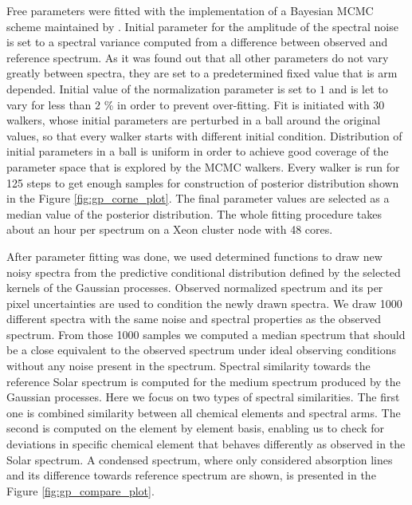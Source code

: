 Free parameters were fitted with the implementation of a Bayesian MCMC scheme maintained by \cite{2013PASP..125..306F}. Initial parameter for the amplitude of the spectral noise is set to a spectral variance computed from a difference between observed and reference spectrum. As it was found out that all other parameters do not vary greatly between spectra, they are set to a predetermined fixed value that is arm depended. Initial value of the normalization parameter is set to $1$ and is let to vary for less than $2$ \% in order to prevent over-fitting. Fit is initiated with 30 walkers, whose initial parameters are perturbed in a ball around the original values, so that every walker starts with different initial condition. Distribution of initial parameters in a ball is uniform in order to achieve good coverage of the parameter space that is explored by the MCMC walkers. Every walker is run for 125 steps to get enough samples for construction of posterior distribution shown in the Figure \ref{fig:gp_corne_plot}. The final parameter values are selected as a median value of the posterior distribution. The whole fitting procedure takes about an hour per spectrum on a Xeon cluster node with 48 cores.

After parameter fitting was done, we used determined functions to draw new noisy spectra from the predictive conditional distribution defined by the selected kernels of the Gaussian processes. Observed normalized spectrum and its per pixel uncertainties are used to condition the newly drawn spectra. We draw 1000 different spectra with the same noise and spectral properties as the observed spectrum. From those 1000 samples we computed a median spectrum that should be a close equivalent to the observed spectrum under ideal observing conditions without any noise present in the spectrum. Spectral similarity towards the reference Solar spectrum is computed for the medium spectrum produced by the Gaussian processes. Here we focus on two types of spectral similarities. The first one is combined similarity between all chemical elements and spectral arms. The second is computed on the element by element basis, enabling us to check for deviations in specific chemical element that behaves differently as observed in the Solar spectrum. A condensed spectrum, where only considered absorption lines and its difference towards reference spectrum are shown, is presented in the Figure \ref{fig:gp_compare_plot}.

